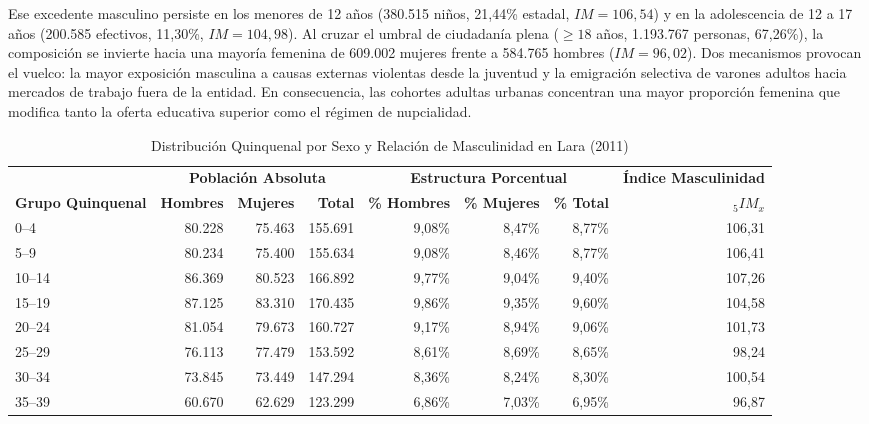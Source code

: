 \documentclass[12pt,letterpaper]{article}
\begin{document}
Ese excedente masculino persiste en los menores de 12 años (380.515 niños, 21,44\% estadal, $IM = 106,54$) y en la adolescencia de 12 a 17 años (200.585 efectivos, 11,30\%, $IM = 104,98$). Al cruzar el umbral de ciudadanía plena ($\ge 18$ años, 1.193.767 personas, 67,26\%), la composición se invierte hacia una mayoría femenina de 609.002 mujeres frente a 584.765 hombres ($IM = 96,02$). Dos mecanismos provocan el vuelco: la mayor exposición masculina a causas externas violentas desde la juventud y la emigración selectiva de varones adultos hacia mercados de trabajo fuera de la entidad. En consecuencia, las cohortes adultas urbanas concentran una mayor proporción femenina que modifica tanto la oferta educativa superior como el régimen de nupcialidad.

\begin{table}[htbp]
    \centering
    \caption{Distribución Quinquenal por Sexo y Relación de Masculinidad en Lara (2011)}
    \label{tab:piramide_quinquenal}
    \scriptsize
    \setlength{\tabcolsep}{3.5pt}
    \begin{tabular*}{\textwidth}{@{\extracolsep{\fill}}lrrrrrrr}
        \toprule
        & \multicolumn{3}{c}{\textbf{Población Absoluta}} & \multicolumn{3}{c}{\textbf{Estructura Porcentual}} & \textbf{Índice Masculinidad} \\
        \cmidrule(lr){2-4} \cmidrule(lr){5-7} \cmidrule(lr){8-8}
        \textbf{Grupo Quinquenal} & \textbf{Hombres} & \textbf{Mujeres} & \textbf{Total} & \textbf{\% Hombres} & \textbf{\% Mujeres} & \textbf{\% Total} & ${}_5 IM_x$ \\
        \midrule
        0--4 & 80.228 & 75.463 & 155.691 & 9,08\% & 8,47\% & 8,77\% & 106,31 \\
        5--9 & 80.234 & 75.400 & 155.634 & 9,08\% & 8,46\% & 8,77\% & 106,41 \\
        10--14 & 86.369 & 80.523 & 166.892 & 9,77\% & 9,04\% & 9,40\% & 107,26 \\
        15--19 & 87.125 & 83.310 & 170.435 & 9,86\% & 9,35\% & 9,60\% & 104,58 \\
        20--24 & 81.054 & 79.673 & 160.727 & 9,17\% & 8,94\% & 9,06\% & 101,73 \\
        25--29 & 76.113 & 77.479 & 153.592 & 8,61\% & 8,69\% & 8,65\% & 98,24 \\
        30--34 & 73.845 & 73.449 & 147.294 & 8,36\% & 8,24\% & 8,30\% & 100,54 \\
        35--39 & 60.670 & 62.629 & 123.299 & 6,86\% & 7,03\% & 6,95\% & 96,87 \\

\end{tabular*}
\end{table}
\end{document}
